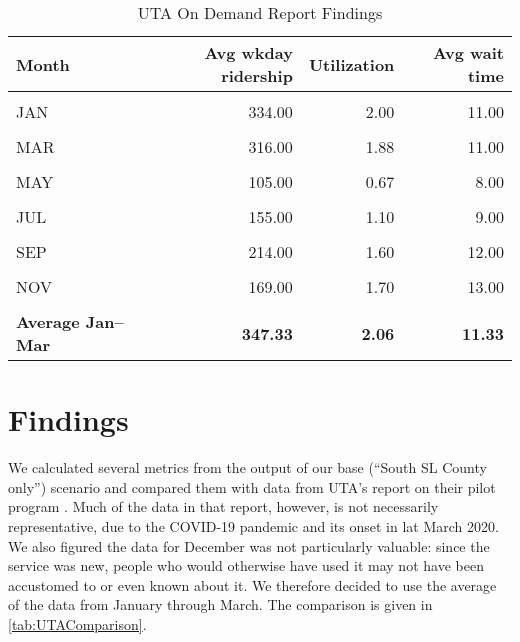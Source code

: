 \documentclass[3p, authoryear]{elsarticle} %
\begin{document}
\begin{table}[H]

\caption{\label{tab:UTAOD}UTA On Demand Report Findings}
\centering
\begin{tabular}[t]{lrrr}
\toprule
Month & Avg wkday ridership & Utilization & Avg wait time\\
\midrule
\cellcolor{gray!6}{DEC} & \cellcolor{gray!6}{224.00} & \cellcolor{gray!6}{1.33} & \cellcolor{gray!6}{9.00}\\
JAN & 334.00 & 2.00 & 11.00\\
\cellcolor{gray!6}{FEB} & \cellcolor{gray!6}{392.00} & \cellcolor{gray!6}{2.31} & \cellcolor{gray!6}{12.00}\\
MAR & 316.00 & 1.88 & 11.00\\
\cellcolor{gray!6}{APR} & \cellcolor{gray!6}{275.00} & \cellcolor{gray!6}{1.52} & \cellcolor{gray!6}{10.00}\\
MAY & 105.00 & 0.67 & 8.00\\
\cellcolor{gray!6}{JUN} & \cellcolor{gray!6}{162.00} & \cellcolor{gray!6}{1.10} & \cellcolor{gray!6}{9.00}\\
JUL & 155.00 & 1.10 & 9.00\\
\cellcolor{gray!6}{AUG} & \cellcolor{gray!6}{193.00} & \cellcolor{gray!6}{1.50} & \cellcolor{gray!6}{12.00}\\
SEP & 214.00 & 1.60 & 12.00\\
\cellcolor{gray!6}{OCT} & \cellcolor{gray!6}{200.00} & \cellcolor{gray!6}{1.70} & \cellcolor{gray!6}{13.00}\\
NOV & 169.00 & 1.70 & 13.00\\
\textbf{\cellcolor{gray!6}{Average}} & \textbf{\cellcolor{gray!6}{228.25}} & \textbf{\cellcolor{gray!6}{1.53}} & \textbf{\cellcolor{gray!6}{10.75}}\\
\textbf{Average Jan--Mar} & \textbf{347.33} & \textbf{2.06} & \textbf{11.33}\\
\bottomrule
\end{tabular}
\end{table}

\hypertarget{findings}{%
\section{Findings}\label{findings}}

We calculated several metrics from the output of our base (``South SL County only'') scenario and compared them with data from UTA's report on their pilot program \citep[\citet{UTAevalQ2}, \citet{UTAevalQ3}, \citet{UTAevalQ4}]{UTAevalQ1}.
Much of the data in that report, however, is not necessarily representative, due to the COVID-19 pandemic and its onset in lat March 2020.
We also figured the data for December was not particularly valuable: since the service was new, people who would otherwise have used it may not have been accustomed to or even known about it.
We therefore decided to use the average of the data from January through March.
The comparison is given in \ref{tab:UTAComparison}.
\end{document}
